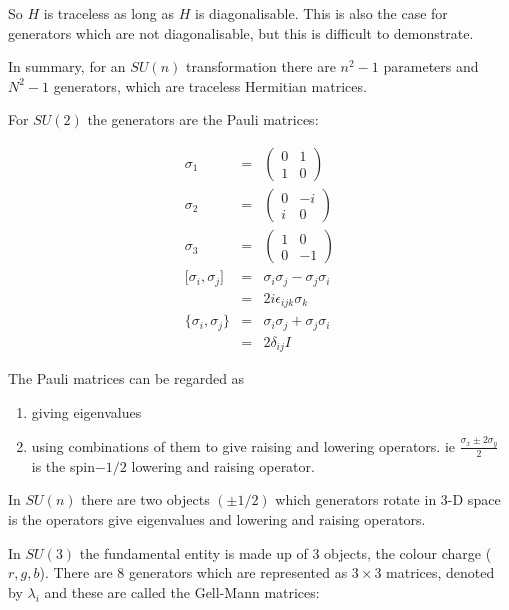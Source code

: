 So $H$ is traceless as long as $H$ is diagonalisable.  This is also the case for generators which are not diagonalisable, but this is difficult to demonstrate.

In summary, for an $SU(n)$ transformation there are $n^2-1$ parameters and $N^2-1$ generators, which are traceless Hermitian matrices.

For $SU(2)$ the generators are the Pauli matrices:

\begin{eqnarray*}
  \sigma_1 & = &
  \left(
  \begin{array}{cc}
    0 & 1 \\
    1 & 0
  \end{array}
  \right)
  \\
  \sigma_2 & = &
  \left(
  \begin{array}{cc}
    0 & -i \\
    i & 0
  \end{array}
  \right)
  \\
  \sigma_3 & = &
  \left(
  \begin{array}{cc}
    1 & 0 \\
    0 & -1
  \end{array}
  \right)
  \\
  \lbrack \sigma_i , \sigma_j \rbrack & = & \sigma_i \sigma_j - \sigma_j \sigma_i \\
  & = & 2i\epsilon_{ijk}\sigma_k \\
  \{ \sigma_i , \sigma_j \} & = & \sigma_i \sigma_j + \sigma_j \sigma_i \\
  & = & 2\delta_{ij}I
\end{eqnarray*}

The Pauli matrices can be regarded as 

\begin{enumerate}
\item giving eigenvalues
\item using combinations of them to give raising and lowering operators.  ie $\frac{\sigma_x \pm 2\sigma_y}{2}$ is the spin$-1/2$ lowering and raising operator.
\end{enumerate}

In $SU(n)$ there are two objects $(\pm 1/2)$ which generators rotate in $3$-D space is the operators give eigenvalues and lowering and raising operators.

In $SU(3)$ the fundamental entity is made up of $3$ objects, the colour charge ($r,g,b$).  There are $8$ generators which are represented as $3\times 3$ matrices, denoted by $\lambda_i$ and these are called the Gell-Mann matrices:


